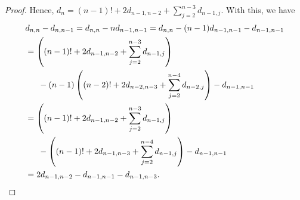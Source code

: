 \documentclass[10pt,a4paper]{amsart}
\begin{document}
\begin{proof}
Hence, 
        $d_n
        = (n-1)! + 2d_{n-1,n-2} + \sum_{j=2}^{n-3} d_{n-1,j}$.
    With this, we have %
\begin{align*}
        &d_{n,n} - d_{n,n-1}= d_{n,n} - n d_{n-1,n-1} = d_{n,n} - (n-1) d_{n-1,n-1} - d_{n-1,n-1} \\
        &= \left( (n-1)! + 2d_{n-1,n-2} + \sum_{j=2}^{n-3} d_{n-1,j} \right) \\
        &\phantom{==} - (n-1) \left( (n-2)! + 2d_{n-2,n-3} + \sum_{j=2}^{n-4} d_{n-2,j} \right) 
        - d_{n-1,n-1}   \\
        &= \left( (n-1)! + 2d_{n-1,n-2} + \sum_{j=2}^{n-3} d_{n-1,j} \right) \\
        &\phantom{==} - \left( (n-1)! + 2d_{n-1,n-3} + \sum_{j=2}^{n-4} d_{n-1,j} \right)
        - d_{n-1,n-1}   \\
        &= 2d_{n-1,n-2} - d_{n-1,n-1} - d_{n-1,n-3}.	\qedhere
\end{align*}
\end{proof}
\end{document}
